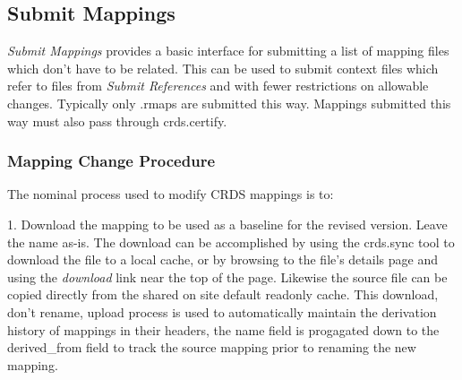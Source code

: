 \documentclass[letterpaper,10pt,english]{sphinxmanual}
\begin{document}
\subsection{Submit Mappings}
\label{web_site_use:submit-mappings}
\emph{Submit Mappings} provides a basic interface for submitting a list of mapping
files which don't have to be related.   This can be used to submit context files
which refer to files from \emph{Submit References} and with fewer restrictions on
allowable changes.   Typically only .rmaps are submitted this way.   Mappings
submitted this way must also pass through crds.certify.
\begin{figure}[htbp]
\centering

\end{figure}


\subsubsection{Mapping Change Procedure}
\label{web_site_use:mapping-change-procedure}
The nominal process used to modify CRDS mappings is to:

1. Download the mapping to be used as a baseline for the revised version.
Leave the name as-is.  The download can be accomplished by using the crds.sync
tool to download the file to a local cache, or by browsing to the file's
details page and using the \emph{download} link near the top of the page.  Likewise
the source file can be copied directly from the shared on site default
readonly cache.   This download, don't rename, upload process is used to
automatically maintain the derivation history of mappings in their headers,
the name field is progagated down to the derived\_from field to track the
source mapping prior to renaming the new mapping.
\end{document}
